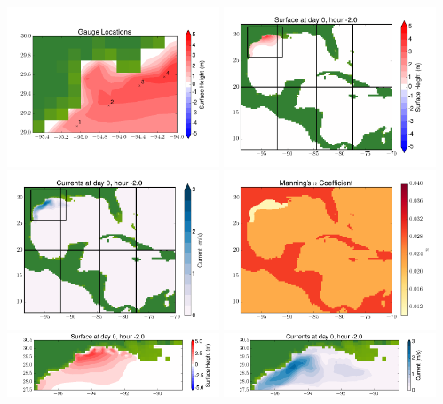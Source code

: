 \documentclass[11pt]{article}
\begin{document}
\includegraphics[width=0.475\textwidth]{frame0069fig10.png}
\vskip 10pt 
\includegraphics[width=0.475\textwidth]{frame0070fig1.png}
\includegraphics[width=0.475\textwidth]{frame0070fig2.png}
\vskip 10pt 
\includegraphics[width=0.475\textwidth]{frame0070fig3.png}
\includegraphics[width=0.475\textwidth]{frame0070fig4.png}
\vskip 10pt 
\includegraphics[width=0.475\textwidth]{frame0070fig5.png}
\end{document}
